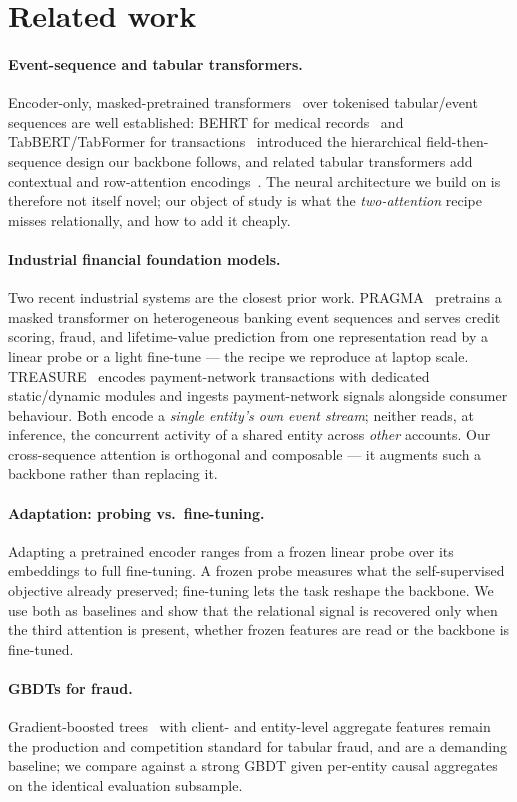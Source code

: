 \section{Related work}
\label{sec:related}

\paragraph{Event-sequence and tabular transformers.} Encoder-only, masked-pretrained
transformers~\cite{vaswani2017attention,devlin2019bert} over tokenised tabular/event sequences are
well established: BEHRT for medical records~\cite{li2020behrt} and TabBERT/TabFormer for
transactions~\cite{padhi2021tabular} introduced the hierarchical field-then-sequence design our
backbone follows, and related tabular transformers add contextual and row-attention
encodings~\cite{huang2020tabtransformer,somepalli2021saint,gorishniy2022embeddings}. The neural
architecture we build on is therefore not itself novel; our object of study is what the
\emph{two-attention} recipe misses relationally, and how to add it cheaply.

\paragraph{Industrial financial foundation models.} Two recent industrial systems are the closest
prior work. PRAGMA~\cite{ostroukhov2026pragma} pretrains a masked transformer on heterogeneous
banking event sequences and serves credit scoring, fraud, and lifetime-value prediction from one
representation read by a linear probe or a light fine-tune --- the recipe we reproduce at
laptop scale. TREASURE~\cite{yeh2025treasure} encodes payment-network transactions with dedicated
static/dynamic modules and ingests payment-network signals alongside consumer behaviour. Both encode
a \emph{single entity's own event stream}; neither reads, at inference, the concurrent activity of a
shared entity across \emph{other} accounts. Our cross-sequence attention is orthogonal and composable
--- it augments such a backbone rather than replacing it.

\paragraph{Adaptation: probing vs.\ fine-tuning.} Adapting a pretrained encoder ranges from a frozen
linear probe over its embeddings to full fine-tuning. A frozen probe measures what the
self-supervised objective already preserved; fine-tuning lets the task reshape the backbone. We use
both as baselines and show that the relational signal is recovered only when the third attention is
present, whether frozen features are read or the backbone is fine-tuned.

\paragraph{GBDTs for fraud.} Gradient-boosted trees~\cite{ke2017lightgbm,chen2016xgboost} with
client- and entity-level aggregate features remain the production and competition standard for
tabular fraud, and are a demanding baseline; we compare against a strong GBDT given per-entity causal
aggregates on the identical evaluation subsample.
